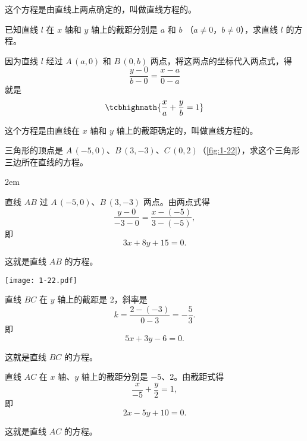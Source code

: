 这个方程是由直线上两点确定的，叫做直线方程的。
\begin{example}
  已知直线 $l$ 在 $x$ 轴和 $y$ 轴上的截距分别是 $a$ 和 $b$ （$a\neq 0$，$b\neq 0$），求直线 $l$ 的方程。
\end{example}
\begin{solution}
  因为直线 $l$ 经过 $A\,(a,0)$ 和 $B\,(0,b)$ 两点，将这两点的坐标代入两点式，得
\[ \frac{y-0}{b-0} = \frac{x-a}{0-a} \]
就是
\[ \tcbhighmath{\frac{x}{a} + \frac{y}{b} = 1} \]
\end{solution}

这个方程是由直线在 $x$ 轴和 $y$ 轴上的截距确定的，叫做直线方程的。
\begin{example}
  三角形的顶点是 $A\,(-5,0)$、$B\,(3,-3)$、$C\,(0,2)$（\cref{fig:1-22}），求这个三角形三边所在直线的方程。
\end{example}
\noindent
\begin{minipage}{0.55\linewidth}\parindent2em
\begin{solution}
  直线 $AB$ 过 $A\,(-5,0)$、$B\,(3,-3)$ 两点。由两点式得
  \[ \frac{y-0}{-3-0}=\frac{x-(-5)}{3-(-5)},\]
  即
  \[ 3x + 8y + 15 = 0 .\]

  这就是直线 $AB$ 的方程。
\end{solution}
\end{minipage}\hfill
\begin{minipage}{0.45\linewidth}\centering
  \begin{figurehere}
    \texttt{[image: 1-22.pdf]}
    \caption{}\label{fig:1-22}
  \end{figurehere}
\end{minipage}

\medskip
  直线 $BC$ 在 $y$ 轴上的截距是 2，斜率是
  \[ k=\frac{2-(-3)}{0-3}=-\frac{5}{3}. \]
  即
  \[ 5x + 3y - 6 = 0 .\]

  这就是直线 $BC$ 的方程。

  直线 $AC$ 在 $x$ 轴、$y$ 轴上的截距分别是 $-5$、2。由截距式得
  \[ \frac{x}{-5} + \frac{y}{2} = 1,\]
  即
  \[ 2x - 5y + 10 = 0 .\]

  这就是直线 $AC$ 的方程。

